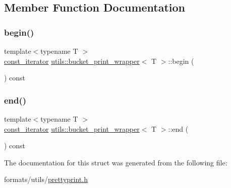 \subsection{Member Function Documentation}
\mbox{\label{structutils_1_1bucket__print__wrapper_a2fedb23cb885fb89e9dca474d1dd8a88}} 
\subsubsection{\texorpdfstring{begin()}{begin()}}
{\footnotesize\ttfamily template$<$typename T $>$ \\
\mbox{\hyperlink{structutils_1_1bucket__print__wrapper_a366d347432ad92e4805eb1f14c287131}{const\+\_\+iterator}} \mbox{\hyperlink{structutils_1_1bucket__print__wrapper}{utils\+::bucket\+\_\+print\+\_\+wrapper}}$<$ T $>$\+::begin (\begin{DoxyParamCaption}{ }\end{DoxyParamCaption}) const\hspace{0.3cm}{\ttfamily [inline]}}

\mbox{\label{structutils_1_1bucket__print__wrapper_a4f07519e738b3625b9877766a712b034}} 
\subsubsection{\texorpdfstring{end()}{end()}}
{\footnotesize\ttfamily template$<$typename T $>$ \\
\mbox{\hyperlink{structutils_1_1bucket__print__wrapper_a366d347432ad92e4805eb1f14c287131}{const\+\_\+iterator}} \mbox{\hyperlink{structutils_1_1bucket__print__wrapper}{utils\+::bucket\+\_\+print\+\_\+wrapper}}$<$ T $>$\+::end (\begin{DoxyParamCaption}{ }\end{DoxyParamCaption}) const\hspace{0.3cm}{\ttfamily [inline]}}



The documentation for this struct was generated from the following file\+:\begin{DoxyCompactItemize}
\item 
formats/utils/\mbox{\hyperlink{prettyprint_8h}{prettyprint.\+h}}\end{DoxyCompactItemize}
